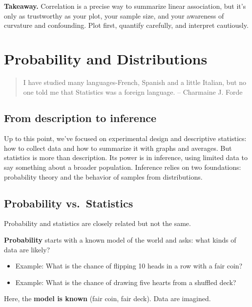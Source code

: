 \documentclass[
  letterpaper,
  DIV=11,
  numbers=noendperiod]{scrreprt}
\providecommand{\tightlist}{%
  \setlength{\itemsep}{0pt}\setlength{\parskip}{0pt}}
\begin{document}
\textbf{Takeaway.} Correlation is a precise way to summarize linear
association, but it's only as trustworthy as your plot, your sample
size, and your awareness of curvature and confounding. Plot first,
quantify carefully, and interpret cautiously.


\chapter{Probability and
Distributions}\label{probability-and-distributions}

\begin{quote}
I have studied many languages-French, Spanish and a little Italian, but
no one told me that Statistics was a foreign language. -- Charmaine J.
Forde
\end{quote}

\section{From description to
inference}\label{from-description-to-inference}

Up to this point, we've focused on experimental design and descriptive
statistics: how to collect data and how to summarize it with graphs and
averages. But statistics is more than description. Its power is in
inference, using limited data to say something about a broader
population. Inference relies on two foundations: probability theory and
the behavior of samples from distributions.

\section{Probability vs.~Statistics}\label{probability-vs.-statistics}

Probability and statistics are closely related but not the same.

\textbf{Probability} starts with a known model of the world and asks:
what kinds of data are likely?

\begin{itemize}
\tightlist
\item
  Example: What is the chance of flipping 10 heads in a row with a fair
  coin?
\item
  Example: What is the chance of drawing five hearts from a shuffled
  deck?
\end{itemize}

Here, the \textbf{model is known} (fair coin, fair deck). Data are
imagined.
\end{document}

